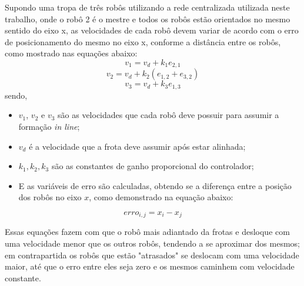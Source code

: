 Supondo uma tropa de três robôs utilizando a rede centralizada utilizada neste trabalho, onde o robô 2 é o mestre e todos os robôs estão orientados no mesmo sentido do eixo x, as velocidades de cada robô devem variar de acordo com o erro de posicionamento do mesmo no eixo x, conforme a distância entre os robôs, como mostrado nas  equações abaixo:
\begin{equation}
v_{1} = v_{d} + k_{1} e_{2,1}
\label{eq:vel1P1}
\end{equation}
\begin{equation}
v_{2} = v_{d} + k_{2} (e_{1,2} + e_{3,2})
\label{eq:vel2P1}
\end{equation}
\begin{equation}
v_{3} = v_{d} + k_{3} e_{1,3}
\label{eq:vel3P1}
\end{equation}
sendo,
\begin{itemize}
	\item $v_{1}$, $v_{2}$ e $v_{3}$ são as velocidades que cada robô deve possuir para assumir a formação \emph{in line};
	\item $v_{d}$ é a velocidade que a frota deve assumir após estar alinhada;
	\item $k_{1},k_{2},k_{3}$ são as constantes de ganho proporcional do controlador;
	\item E as variáveis de erro são calculadas, obtendo se a diferença entre a posição dos robôs no eixo $x$, como demonstrado na equação abaixo:	
\end{itemize}
\begin{equation}
erro_{i,j} = x_{i} - x_{j}
\label{eq:errp1}
\end{equation}

 Essas equações fazem com que o robô mais adiantado da frotas e desloque com uma velocidade menor que os outros robôs, tendendo a se aproximar dos mesmos; em contrapartida os robôs que estão "atrasados" \hspace{2pt} se deslocam com uma velocidade maior, até que o erro entre eles seja zero e os mesmos caminhem com velocidade constante. 


